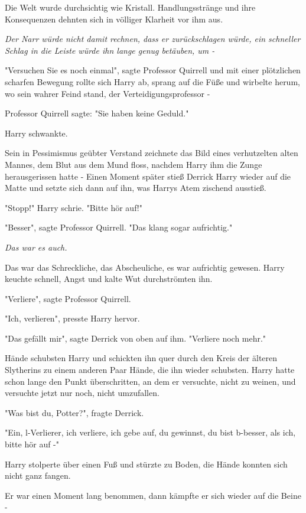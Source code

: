 {Die Welt wurde durchsichtig wie Kristall. Handlungsstränge und ihre Konsequenzen dehnten sich in völliger Klarheit vor ihm aus.

\emph{Der Narr würde nicht damit rechnen, dass er zurückschlagen würde, ein schneller Schlag in die Leiste würde ihn lange genug betäuben, um -}

"Versuchen Sie es noch einmal", sagte Professor Quirrell und mit einer plötzlichen scharfen Bewegung rollte sich Harry ab, sprang auf die Füße und wirbelte herum, wo sein wahrer Feind stand, der Verteidigungsprofessor -

Professor Quirrell sagte: "Sie haben keine Geduld."

Harry schwankte.

Sein in Pessimismus geübter Verstand zeichnete das Bild eines verhutzelten alten Mannes, dem Blut aus dem Mund floss, nachdem Harry ihm die Zunge herausgerissen hatte - Einen Moment später stieß Derrick Harry wieder auf die Matte und setzte sich dann auf ihn, was Harrys Atem zischend ausstieß.

"Stopp!" Harry schrie. "Bitte hör auf!"

"Besser", sagte Professor Quirrell. "Das klang sogar aufrichtig."

\emph{Das war es auch.}

Das war das Schreckliche, das Abscheuliche, es war aufrichtig gewesen. Harry keuchte schnell, Angst und kalte Wut durchströmten ihn.

"Verliere", sagte Professor Quirrell.

"Ich, verlieren", presste Harry hervor.

"Das gefällt mir", sagte Derrick von oben auf ihm. "Verliere noch mehr."

Hände schubsten Harry und schickten ihn quer durch den Kreis der älteren Slytherins zu einem anderen Paar Hände, die ihn wieder schubsten. Harry hatte schon lange den Punkt überschritten, an dem er versuchte, nicht zu weinen, und versuchte jetzt nur noch, nicht umzufallen.

"Was bist du, Potter?", fragte Derrick.

"Ein, l-Verlierer, ich verliere, ich gebe auf, du gewinnst, du bist b-besser, als ich, bitte hör auf -"

Harry stolperte über einen Fuß und stürzte zu Boden, die Hände konnten sich nicht ganz fangen.

Er war einen Moment lang benommen, dann kämpfte er sich wieder auf die Beine -

}
